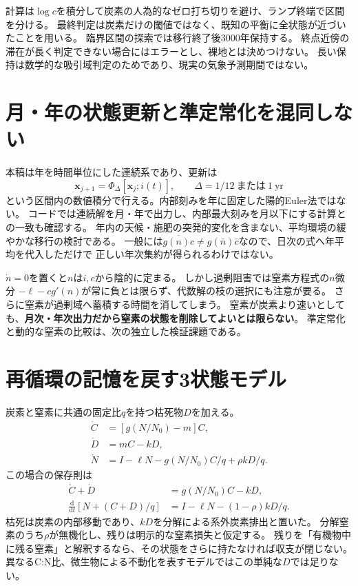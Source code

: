 \documentclass[a4paper,11pt]{ltjsarticle}
\newcommand{\dd}{\mathrm d}
\begin{document}
計算は$\log c$を積分して炭素の人為的なゼロ打ち切りを避け、ランプ終端で区間を分ける。
最終判定は炭素だけの閾値ではなく、既知の平衡に全状態が近づいたことを用いる。
臨界区間の探索では移行終了後3000年保持する。
終点近傍の滞在が長く判定できない場合にはエラーとし、裸地とは決めつけない。
長い保持は数学的な吸引域判定のためであり、現実の気象予測期間ではない。

\section{月・年の状態更新と準定常化を混同しない}
本稿は年を時間単位にした連続系であり、更新は
\begin{equation}
\bm x_{j+1}=\Phi_{\Delta}[\bm x_j;i(t)],\qquad
\Delta=1/12\ \text{または}\ 1\ \mathrm{yr}
\end{equation}
という区間内の数値積分で行える。内部刻みを年に固定した陽的Euler法ではない。
コードでは連続解を月・年で出力し、内部最大刻みを月以下にする計算との一致も確認する。
年内の天候・施肥の突発的変化を含まない、平均環境の緩やかな移行の検討である。
一般には$\overline{g(n)c}\neq g(\bar n)\bar c$なので、日次の式へ年平均を代入しただけで
正しい年次集約が得られるわけではない。

$\dot n=0$を置くと$n$は$i,c$から陰的に定まる。
しかし過剰阻害では窒素方程式の$n$微分
$-\ell-cg'(n)$が常に負とは限らず、代数解の枝の選択にも注意が要る。
さらに窒素が過剰域へ蓄積する時間を消してしまう。
窒素が炭素より速いとしても、\textbf{月次・年次出力だから窒素の状態を削除してよいとは限らない}。
準定常化と動的な窒素の比較は、次の独立した検証課題である。

\section{再循環の記憶を戻す3状態モデル}\label{sec:three}
炭素と窒素に共通の固定比$q$を持つ枯死物$D$を加える。
\begin{equation}\boxed{\begin{aligned}
\dot C&=[g(N/N_0)-m]C,\\
\dot D&=mC-kD,\\
\dot N&=I-\ell N-g(N/N_0)C/q+\rho kD/q.
\end{aligned}}\label{eq:three}\end{equation}
この場合の保存則は
\begin{align}
\dot C+\dot D&=g(N/N_0)C-kD,\\
\frac{\dd}{\dd t}\left[N+(C+D)/q\right]
&=I-\ell N-(1-\rho)kD/q.
\end{align}
枯死は炭素の内部移動であり、$kD$を分解による系外炭素排出と置いた。
分解窒素のうち$\rho$が無機化し、残りは明示的な窒素損失と仮定する。
残りを「有機物中に残る窒素」と解釈するなら、その状態をさらに持たなければ収支が閉じない。
異なるC:N比、微生物による不動化を表すモデルではこの単純な$D$では足りない。
\end{document}
